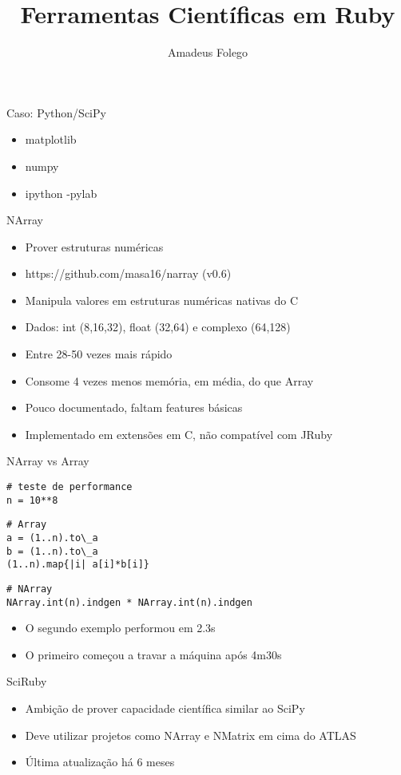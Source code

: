 \documentclass{beamer}
\author{Amadeus Folego}
\title{Ferramentas Científicas em Ruby}
\date{}
\institute{
  \begin{tabular}{c c}
    {\em email} & \url{amadeusfolego[at]gmail[dot]com}\\
    {\em github} & \url{@badosu}\\
    {\em twitter} & \url{@badosu\_}
  \end{tabular}
}
\begin{document}
  \frame[plain]{ \titlepage }
  \begin{frame}{Caso: Python/SciPy}
    \begin{itemize}
      \item matplotlib \pause
      \item numpy \pause
      \item ipython -pylab
    \end{itemize}
  \end{frame}
  \begin{frame}[fragile]{NArray}
    \begin{itemize}
      \item Prover estruturas numéricas \pause
      \item https://github.com/masa16/narray (v0.6) \pause
      \item Manipula valores em estruturas numéricas nativas do C \pause
      \item Dados: int (8,16,32), float (32,64) e complexo (64,128) \pause
      \item Entre 28-50 vezes mais rápido \pause
      \item Consome 4 vezes menos memória, em média, do que Array \pause
      \item Pouco documentado, faltam features básicas \pause
      \item Implementado em extensões em C, não compatível com JRuby
    \end{itemize}
\end{frame}
  \begin{frame}[fragile]{NArray vs Array}
    \begin{verbatim}
# teste de performance
n = 10**8
    \end{verbatim}
    \pause
    \begin{verbatim}
# Array
a = (1..n).to\_a
b = (1..n).to\_a
(1..n).map{|i| a[i]*b[i]}
    \end{verbatim}
    \pause
    \begin{verbatim}
# NArray
NArray.int(n).indgen * NArray.int(n).indgen
    \end{verbatim}
    \pause
    \begin{itemize}
      \item O segundo exemplo performou em 2.3s \pause
      \item O primeiro começou a travar a máquina após 4m30s
    \end{itemize}
\end{frame}
\begin{frame}{SciRuby}
  \begin{itemize}
    \item Ambição de prover capacidade científica similar ao SciPy \pause
    \item Deve utilizar projetos como NArray e NMatrix em cima do ATLAS \pause
    \item Última atualização há 6 meses
  \end{itemize}
\end{frame}
  \begin{frame}[plain]
    \titlepage
  \end{frame}
\end{document}
